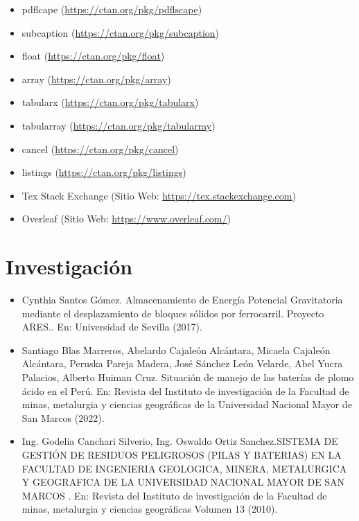 \begin{itemize} [label=•]
                \item pdflcape (\href{https://ctan.org/pkg/pdflscape}{https://ctan.org/pkg/pdflscape})
                \item subcaption (\href{https://ctan.org/pkg/subcaption}{https://ctan.org/pkg/subcaption})
                \item float (\href{https://ctan.org/pkg/float}{https://ctan.org/pkg/float})
                \item array (\href{https://ctan.org/pkg/array}{https://ctan.org/pkg/array})
                \item tabularx (\href{https://ctan.org/pkg/tabularx}{https://ctan.org/pkg/tabularx})
                \item tabularray (\href{https://ctan.org/pkg/tabularray}{https://ctan.org/pkg/tabularray})
                \item cancel (\href{https://ctan.org/pkg/cancel}{https://ctan.org/pkg/cancel})
                \item listings (\href{https://ctan.org/pkg/listings}{https://ctan.org/pkg/listings})
                \item Tex Stack Exchange (Sitio Web: \href{https://tex.stackexchange.com}{https://tex.stackexchange.com})
                \item Overleaf (Sitio Web: \href{https://www.overleaf.com/}{https://www.overleaf.com/})
            \end{itemize}
        \section{Investigación}
            \begin{itemize} [label=•]
                \setlength{\itemindent}{3em}
                \item Cynthia Santos Gómez. \guillemotleft Almacenamiento de Energía Potencial Gravitatoria mediante el desplazamiento de bloques sólidos por ferrocarril. Proyecto ARES.\guillemotright. En: Universidad de Sevilla (2017).
                \item Santiago Blas Marreros, Abelardo Cajaleón Alcántara, Micaela Cajaleón Alcántara, Peruska Pareja Madera, José Sánchez León Velarde, Abel Yucra Palacios, Alberto Huiman Cruz. \guillemotleft Situación de manejo de las baterías de plomo ácido en el Perú\guillemotright. En: Revista del Instituto de investigación de la Facultad de minas, metalurgia y ciencias geográficas de la Universidad Nacional Mayor de San Marcos (2022).
                \item Ing. Godelia Canchari Silverio, Ing. Oswaldo Ortiz Sanchez.\guillemotleft SISTEMA DE GESTIÓN DE RESIDUOS PELIGROSOS (PILAS Y BATERIAS) EN LA FACULTAD DE INGENIERIA GEOLOGICA, MINERA, METALURGICA Y GEOGRAFICA DE LA UNIVERSIDAD NACIONAL MAYOR DE SAN MARCOS \guillemotright. En: Revista del Instituto de investigación de la Facultad de minas, metalurgia y ciencias geográficas Volumen 13 (2010).
            \end{itemize}
